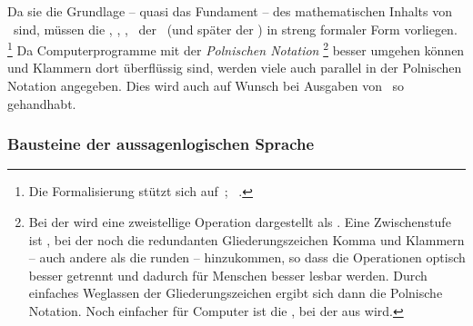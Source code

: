 Da sie die Grundlage -- quasi das Fundament -- des mathematischen Inhalts von \ASBA\ sind, müssen die \Axiome, \Saetze, \Beweise, \textusw\ der \Aussagenlogik\ (und später der \Praedikatenlogik) in streng formaler Form vorliegen.%
\footnote{%
	Die Formalisierung stützt sich auf~\cite{bib:Aussagenlogik}; \alsoname~\cite{bib:LogikDe, bib:LogikEn}.
}
Da Computerprogramme mit der \emph{Polnischen Notation}%
\footnote{%
	Bei der  wird eine zweistellige Operation  dargestellt als .
	Eine Zwischenstufe ist , bei der noch die redundanten Gliederungszeichen Komma und Klammern -- auch andere als die runden -- hinzukommen, so dass die Operationen optisch besser getrennt und dadurch für Menschen besser lesbar werden.
	Durch einfaches Weglassen der Gliederungszeichen ergibt sich dann die Polnische Notation.
	Noch einfacher für Computer ist die , bei der aus   wird.
}
besser umgehen können und Klammern dort überflüssig sind, werden viele  auch parallel in der Polnischen Notation angegeben.
Dies wird auch auf Wunsch bei Ausgaben von \ASBA\ so gehandhabt.

\subsubsection{Bausteine der aussagenlogischen Sprache}%
\label{subsub:Bausteine}

